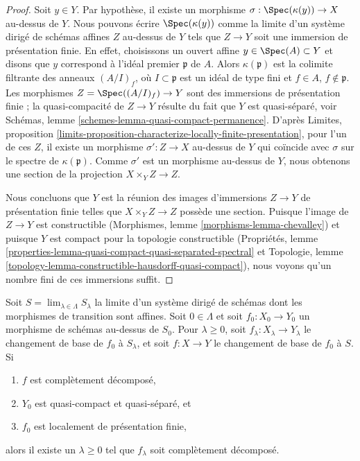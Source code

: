 \begin{proof}
Soit $y \in Y$. Par hypothèse, il existe un morphisme
$\sigma : \Spec(\kappa(y)) \to X$ au-dessus de $Y$. Nous pouvons écrire $\Spec(\kappa(y))$
comme la limite d'un système dirigé de schémas affines $Z$ au-dessus de $Y$ tels que
$Z \to Y$ soit une immersion de présentation finie.
En effet, choisissons un ouvert affine $y \in \Spec(A) \subset Y$
et disons que $y$ correspond à l'idéal premier $\mathfrak p$ de $A$.
Alors $\kappa(\mathfrak p)$ est la colimite filtrante des
anneaux $(A/I)_f$, où $I \subset \mathfrak p$ est un idéal de type fini
et $f \in A$, $f \not \in \mathfrak p$.
Les morphismes $Z = \Spec((A/I)_f) \to Y$ sont des immersions de
présentation finie ; la quasi-compacité de $Z \to Y$
résulte du fait que $Y$ est quasi-séparé, voir
Schémas, lemme \ref{schemes-lemma-quasi-compact-permanence}.
D'après Limites, proposition
\ref{limits-proposition-characterize-locally-finite-presentation},
pour l'un de ces $Z$, il existe un morphisme $\sigma' : Z \to X$ au-dessus de $Y$
qui coïncide avec $\sigma$ sur le spectre de $\kappa(\mathfrak p)$.
Comme $\sigma'$ est un morphisme au-dessus de $Y$, nous obtenons une section
de la projection $X \times_Y Z \to Z$.

\medskip\noindent
Nous concluons que $Y$ est la réunion des images d'immersions
$Z \to Y$ de présentation finie telles que $X \times_Y Z \to Z$
possède une section. Puisque l'image de $Z \to Y$ est constructible
(Morphismes, lemme \ref{morphisms-lemma-chevalley})
et puisque $Y$ est compact pour la topologie constructible
(Propriétés, lemme
\ref{properties-lemma-quasi-compact-quasi-separated-spectral} et
Topologie, lemme \ref{topology-lemma-constructible-hausdorff-quasi-compact}),
nous voyons qu'un nombre fini de ces immersions suffit.
\end{proof}

\begin{lemma}
\label{lemma-descend-cd}
Soit $S = \lim_{\lambda \in \Lambda} S_\lambda$
la limite d'un système dirigé de schémas dont les morphismes de transition sont affines.
Soit $0 \in \Lambda$ et soit $f_0 : X_0 \to Y_0$
un morphisme de schémas au-dessus de $S_0$.
Pour $\lambda \geq 0$, soit $f_\lambda : X_\lambda \to Y_\lambda$
le changement de base de $f_0$ à $S_\lambda$, et
soit $f : X \to Y$ le changement de base de $f_0$ à $S$. Si
\begin{enumerate}
\item $f$ est complètement décomposé,
\item $Y_0$ est quasi-compact et quasi-séparé, et
\item $f_0$ est localement de présentation finie,
\end{enumerate}
alors il existe un $\lambda \geq 0$ tel que $f_\lambda$
soit complètement décomposé.
\end{lemma}

